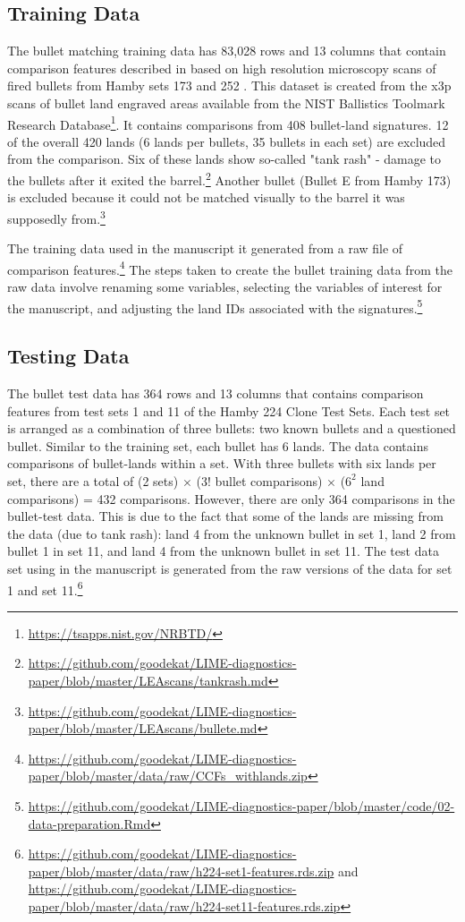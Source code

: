 \documentclass{article}\usepackage[]{graphicx}\usepackage[]{color}
\begin{document}
\subsection{Training Data}

The bullet matching training data has 83,028 rows and 13 columns that contain comparison features described in \citet{hare:2017} based on high resolution microscopy scans of fired bullets from Hamby sets 173 and 252 \citep{hamby:2009}. This dataset is created from the x3p scans of bullet land engraved areas available from the NIST Ballistics Toolmark Research Database\footnote{\url{https://tsapps.nist.gov/NRBTD/}}. It contains comparisons from 408 bullet-land signatures. 12 of the overall 420 lands (6 lands per bullets, 35 bullets in each set) are excluded from the comparison. Six of these lands show so-called "tank rash" - damage to the bullets after it exited the barrel.\footnote{\url{https://github.com/goodekat/LIME-diagnostics-paper/blob/master/LEAscans/tankrash.md}} Another bullet (Bullet E from Hamby 173) is excluded because it could not be matched visually to the barrel it was supposedly from.\footnote{\url{https://github.com/goodekat/LIME-diagnostics-paper/blob/master/LEAscans/bullete.md}}

The training data used in the manuscript it generated from a raw file of comparison features.\footnote{\url{https://github.com/goodekat/LIME-diagnostics-paper/blob/master/data/raw/CCFs\_withlands.zip}} The steps taken to create the bullet training data from the raw data involve renaming some variables, selecting the variables of interest for the manuscript, and adjusting the land IDs associated with the signatures.\footnote{\url{https://github.com/goodekat/LIME-diagnostics-paper/blob/master/code/02-data-preparation.Rmd}} 

\subsection{Testing Data}

The bullet test data has 364 rows and 13 columns that contains comparison features from test sets 1 and 11 of the Hamby 224 Clone Test Sets. Each test set is arranged as a combination of three bullets: two known bullets and a questioned bullet. Similar to the training set, each bullet has 6 lands. The data contains comparisons of bullet-lands within a set. With three bullets with six lands per set, there are a total of (2 sets) $\times$ (3! bullet comparisons) $\times$ ($6^2$ land comparisons) = 432 comparisons. However, there are only 364 comparisons in the bullet-test data. This is due to the fact that some of the lands are missing from the data (due to tank rash): land 4 from the unknown bullet in set 1, land 2 from bullet 1 in set 11, and land 4 from the unknown bullet in set 11. The test data set using in the manuscript is generated from the raw versions of the data for set 1 and set 11.\footnote{\url{https://github.com/goodekat/LIME-diagnostics-paper/blob/master/data/raw/h224-set1-features.rds.zip} and \url{https://github.com/goodekat/LIME-diagnostics-paper/blob/master/data/raw/h224-set11-features.rds.zip}}
\end{document}
